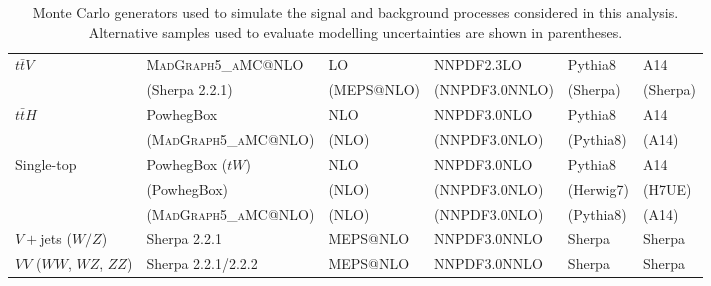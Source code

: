 \begin{table}[htbp]
\begin{tabular}{
p{2.0cm}
p{4.6cm}
p{1.9cm}
p{2.4cm}
p{1.9cm}
p{1.2cm}
}
\multirow{2}{*}{$t\bar tV$}

& \textsc{MadGraph5\_aMC@NLO}
& LO
& NNPDF2.3LO
& Pythia8
& A14 \\

& (Sherpa 2.2.1)
& (MEPS@NLO)
& (NNPDF3.0NNLO)
& (Sherpa)
& (Sherpa) \\

\multirow{2}{*}{$t\bar tH$}

& PowhegBox
& NLO
& NNPDF3.0NLO
& Pythia8
& A14 \\

& (\textsc{MadGraph5\_aMC@NLO})
& (NLO)
& (NNPDF3.0NLO)
& (Pythia8)
& (A14) \\

\multirow{3}{*}{Single-top}

& PowhegBox ($tW$)
& NLO
& NNPDF3.0NLO
& Pythia8
& A14 \\

& (PowhegBox)
& (NLO)
& (NNPDF3.0NLO)
& (Herwig7)
& (H7UE) \\

& (\textsc{MadGraph5\_aMC@NLO})
& (NLO)
& (NNPDF3.0NLO)
& (Pythia8)
& (A14) \\

$V+$jets ($W/Z$)
& Sherpa 2.2.1
& MEPS@NLO
& NNPDF3.0NNLO
& Sherpa
& Sherpa \\

$VV$ ($WW$, $WZ$, $ZZ$)
& Sherpa 2.2.1/2.2.2
& MEPS@NLO
& NNPDF3.0NNLO
& Sherpa
& Sherpa \\

\bottomrule
\end{tabular}

\caption{Monte Carlo generators used to simulate the signal and
background processes considered in this analysis.
Alternative samples used to evaluate modelling uncertainties
are shown in parentheses.}

\label{tab:MC_generators}
\end{table}